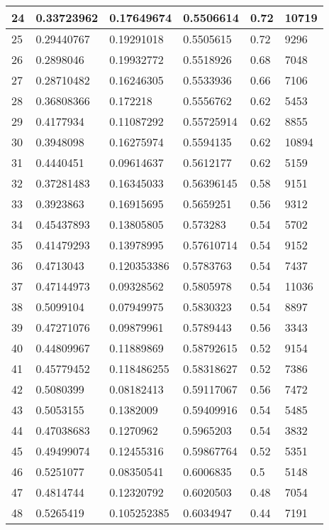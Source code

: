 \begin{longtable}{|l|l|l|l|l|l|}
24 & 0.33723962 & 0.17649674 & 0.5506614 & 0.72 & 10719 \\ \hline 
25 & 0.29440767 & 0.19291018 & 0.5505615 & 0.72 & 9296 \\ \hline 
26 & 0.2898046 & 0.19932772 & 0.5518926 & 0.68 & 7048 \\ \hline 
27 & 0.28710482 & 0.16246305 & 0.5533936 & 0.66 & 7106 \\ \hline 
28 & 0.36808366 & 0.172218 & 0.5556762 & 0.62 & 5453 \\ \hline 
29 & 0.4177934 & 0.11087292 & 0.55725914 & 0.62 & 8855 \\ \hline 
30 & 0.3948098 & 0.16275974 & 0.5594135 & 0.62 & 10894 \\ \hline 
31 & 0.4440451 & 0.09614637 & 0.5612177 & 0.62 & 5159 \\ \hline 
32 & 0.37281483 & 0.16345033 & 0.56396145 & 0.58 & 9151 \\ \hline 
33 & 0.3923863 & 0.16915695 & 0.5659251 & 0.56 & 9312 \\ \hline 
34 & 0.45437893 & 0.13805805 & 0.573283 & 0.54 & 5702 \\ \hline 
35 & 0.41479293 & 0.13978995 & 0.57610714 & 0.54 & 9152 \\ \hline 
36 & 0.4713043 & 0.120353386 & 0.5783763 & 0.54 & 7437 \\ \hline 
37 & 0.47144973 & 0.09328562 & 0.5805978 & 0.54 & 11036 \\ \hline 
38 & 0.5099104 & 0.07949975 & 0.5830323 & 0.54 & 8897 \\ \hline 
39 & 0.47271076 & 0.09879961 & 0.5789443 & 0.56 & 3343 \\ \hline 
40 & 0.44809967 & 0.11889869 & 0.58792615 & 0.52 & 9154 \\ \hline 
41 & 0.45779452 & 0.118486255 & 0.58318627 & 0.52 & 7386 \\ \hline 
42 & 0.5080399 & 0.08182413 & 0.59117067 & 0.56 & 7472 \\ \hline 
43 & 0.5053155 & 0.1382009 & 0.59409916 & 0.54 & 5485 \\ \hline 
44 & 0.47038683 & 0.1270962 & 0.5965203 & 0.54 & 3832 \\ \hline 
45 & 0.49499074 & 0.12455316 & 0.59867764 & 0.52 & 5351 \\ \hline 
46 & 0.5251077 & 0.08350541 & 0.6006835 & 0.5 & 5148 \\ \hline 
47 & 0.4814744 & 0.12320792 & 0.6020503 & 0.48 & 7054 \\ \hline 
48 & 0.5265419 & 0.105252385 & 0.6034947 & 0.44 & 7191 \\ \hline 

\end{longtable}
